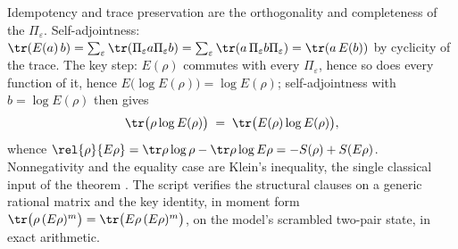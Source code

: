 Idempotency and trace preservation are the orthogonality and completeness of the $\Pi_\varepsilon$. Self-adjointness: $\tr(E(a)\,b) = \sum_\varepsilon \tr(\Pi_\varepsilon a \Pi_\varepsilon b) = \sum_\varepsilon \tr(a\, \Pi_\varepsilon b \Pi_\varepsilon) = \tr(a\,E(b))$ by cyclicity of the trace. The key step: $E(\rho)$ commutes with every $\Pi_\varepsilon$, hence so does every function of it, hence $E\bigl(\log E(\rho)\bigr) = \log E(\rho)$; self-adjointness with $b = \log E(\rho)$ then gives
\[
\tr\bigl(\rho \log E(\rho)\bigr) \;=\; \tr\bigl(E(\rho) \log E(\rho)\bigr) ,
\]
whence $\rel{\rho}{E\rho} = \tr\rho\log\rho - \tr\rho\log E\rho = -S(\rho) + S(E\rho)$. Nonnegativity and the equality case are Klein's inequality, the single classical input of the theorem \cite[\S 11.3]{NielsenChuang}. The script verifies the structural clauses on a generic rational matrix and the key identity, in moment form $\tr\bigl(\rho\,(E\rho)^m\bigr) = \tr\bigl(E\rho\,(E\rho)^m\bigr)$, on the model's scrambled two-pair state, in exact arithmetic.
